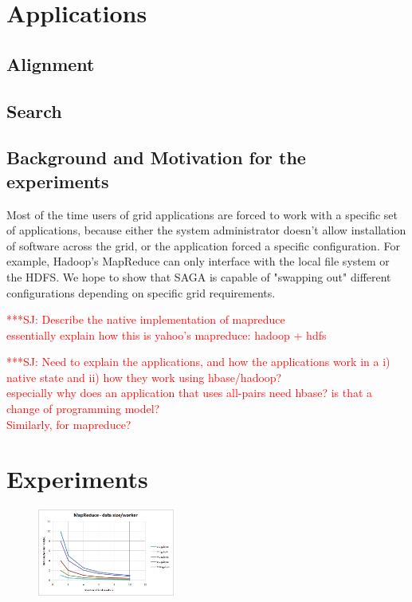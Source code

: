 \documentclass[conference,final]{IEEEtran}
\newcommand{\jhanote}[1]{ {\textcolor{red} { ***SJ: #1 }}}
\newcommand{\jhanote}[1]{}
\begin{document}
\section{Applications}

\subsection*{Alignment}

\subsection*{Search}

\subsection*{Background and Motivation for the experiments}

Most of the time users of grid applications are forced to work with a
specific set of applications, because either the system administrator
doesn't allow installation of software across the grid, or the
application forced a specific configuration.  For example, Hadoop's
MapReduce can only interface with the local file system or the HDFS.
We hope to show that SAGA is capable of "swapping out" different
configurations depending on specific grid requirements.

\jhanote{Describe the native implementation of mapreduce\\
  essentially explain how this is yahoo's mapreduce: hadoop + hdfs}

\jhanote{Need to explain the applications, and how the applications
  work in a i) native state and ii) how they work using hbase/hadoop? \\
  especially why does an application that uses all-pairs need hbase?
  is that a change of programming model?  \\ Similarly, for
  mapreduce?}


\section*{Experiments}

\begin{figure}[t]
  \includegraphics[width=0.4\textwidth]{MapReduce_local_datasizeperworker.png}
\label{}
\end{figure}
\end{document}

